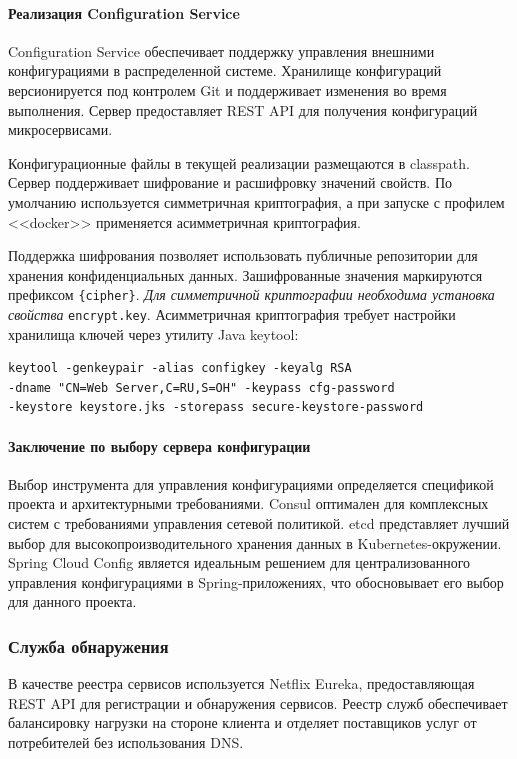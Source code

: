 \paragraph{Реализация Configuration Service}

Configuration Service обеспечивает поддержку управления внешними конфигурациями в распределенной системе. Хранилище конфигураций версионируется под контролем Git и поддерживает изменения во время выполнения.
Сервер предоставляет REST API для получения конфигураций микросервисами.

Конфигурационные файлы в текущей реализации размещаются в classpath.
Сервер поддерживает шифрование и расшифровку значений свойств. По умолчанию используется симметричная криптография, а при запуске с профилем <<docker>> применяется асимметричная криптография.

Поддержка шифрования позволяет использовать публичные репозитории для хранения конфиденциальных данных.
Зашифрованные значения маркируются префиксом \texttt{\{cipher\}}. \textit{Для симметричной криптографии необходима установка свойства} \texttt{encrypt.key}.
Асимметричная криптография требует настройки хранилища ключей через утилиту Java keytool:

\begin{lstlisting}
keytool -genkeypair -alias configkey -keyalg RSA
-dname "CN=Web Server,C=RU,S=OH" -keypass cfg-password
-keystore keystore.jks -storepass secure-keystore-password
\end{lstlisting}

\paragraph{Заключение по выбору сервера конфигурации}

Выбор инструмента для управления конфигурациями определяется спецификой проекта и архитектурными требованиями. Consul оптимален для комплексных систем с требованиями управления сетевой политикой. etcd представляет лучший выбор для высокопроизводительного хранения данных в Kubernetes-окружении. Spring Cloud Config является идеальным решением для централизованного управления конфигурациями в Spring-приложениях, что обосновывает его выбор для данного проекта.

\subsubsection{Служба обнаружения}

В качестве реестра сервисов используется Netflix Eureka, предоставляющая REST API для регистрации и обнаружения сервисов.
Реестр служб обеспечивает балансировку нагрузки на стороне клиента и отделяет поставщиков услуг от потребителей без использования DNS.

